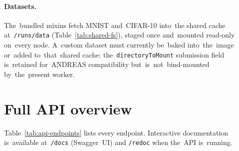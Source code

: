 \paragraph{Datasets.}  The~bundled mixins fetch MNIST and~CIFAR-10 into~the
shared cache at~\texttt{/runs/data} (Table~\ref{tab:shared-fs}), staged once
and~mounted read-only on~every node.  A~custom dataset must currently be~baked
into~the~image or~added to~that~shared cache: the~\texttt{directoryToMount}
submission field is~retained for~ANDREAS compatibility but~is~not~bind-mounted
by~the~present worker.

\section{Full API overview}

Table~\ref{tab:api-endpoints} lists every endpoint.  Interactive
documentation is~available at~\texttt{/docs} (Swagger~UI) and
\texttt{/redoc} when the~API is~running.

